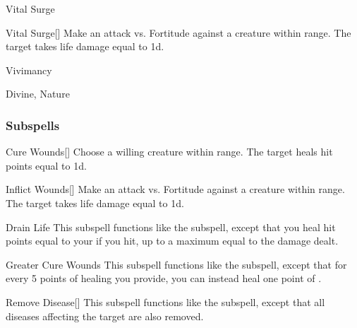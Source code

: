 \newpage
\begin{spellsection}{Vital Surge}


\begin{ability}{Vital Surge}[]
Make an attack vs. Fortitude against a creature within \rngmed range.
\hit The target takes life damage equal to  \minus1d.
\end{ability}




 Vivimancy

 Divine, Nature
\end{spellsection}


\subsubsection{Subspells}


\begin{ability}[\nth{1}]{Cure Wounds}[]
Choose a willing creature within \rngmed range.
The target heals hit points equal to  \plus1d.
\end{ability}
\vspace{0.25em}


\begin{ability}[\nth{1}]{Inflict Wounds}[]
Make an attack vs. Fortitude against a creature within \rngmed range.
\hit The target takes life damage equal to  \plus1d.
\end{ability}
\vspace{0.25em}


\begin{ability}[\nth{2}]{Drain Life}
This subspell functions like the  subspell, except that you heal hit points equal to your  if you hit, up to a maximum equal to the damage dealt.
\end{ability}
\vspace{0.25em}


\begin{ability}[\nth{2}]{Greater Cure Wounds}
This subspell functions like the  subspell, except that for every 5 points of healing you provide, you can instead heal one point of .
\end{ability}
\vspace{0.25em}


\begin{ability}[\nth{2}]{Remove Disease}[]
This subspell functions like the  subspell, except that all diseases affecting the target are also removed.
\end{ability}
\vspace{0.25em}



